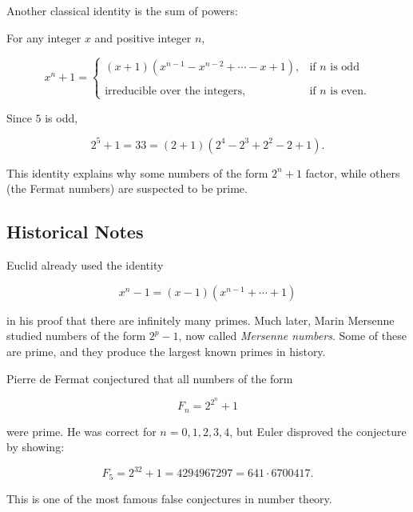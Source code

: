 Another classical identity is the sum of powers:

\begin{theorem}
For any integer \(x\) and positive integer \(n\),


\[
x^n + 1 =
\begin{cases}
(x + 1)(x^{n-1} - x^{n-2} + \cdots - x + 1), & \text{if } n \text{ is odd} \\
\\[6pt]
\text{irreducible over the integers}, & \text{if } n \text{ is even}.
\end{cases}
\]


\end{theorem}

\begin{example}
Since \(5\) is odd,


\[
2^5 + 1 = 33 = (2 + 1)(2^4 - 2^3 + 2^2 - 2 + 1).
\]


This identity explains why some numbers of the form \(2^n + 1\) factor,
while others (the Fermat numbers) are suspected to be prime.
\end{example}

\subsection{Historical Notes}

\begin{remark}
Euclid already used the identity


\[
x^n - 1 = (x - 1)(x^{n-1} + \cdots + 1)
\]


in his proof that there are infinitely many primes.  
Much later, Marin Mersenne studied numbers of the form \(2^p - 1\), now called
\emph{Mersenne numbers}. Some of these are prime, and they produce the largest
known primes in history.
\end{remark}

\begin{remark}
Pierre de Fermat conjectured that all numbers of the form


\[
F_n = 2^{2^n} + 1
\]


were prime.  
He was correct for \(n = 0,1,2,3,4\), but Euler disproved the conjecture by
showing:


\[
F_5 = 2^{32} + 1 = 4294967297 = 641 \cdot 6700417.
\]


This is one of the most famous false conjectures in number theory.
\end{remark}

